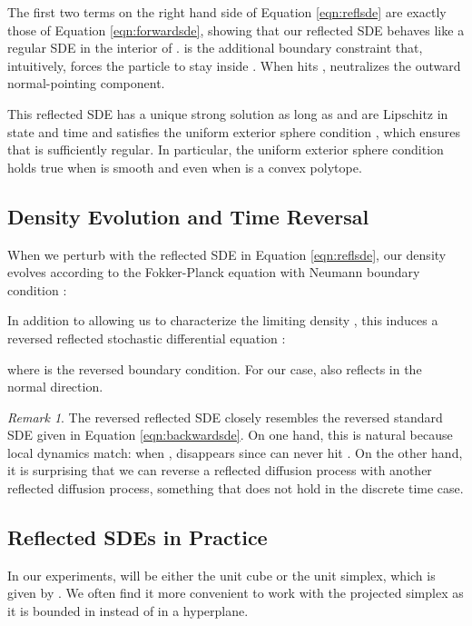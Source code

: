 \documentclass{article}
\theoremstyle{plain}
\theoremstyle{definition}
\theoremstyle{remark}
\newtheorem{remark}[theorem]{Remark}
\begin{document}
The first two terms on the right hand side of Equation \ref{eqn:reflsde} are exactly those of Equation \ref{eqn:forwardsde}, showing that our reflected SDE behaves like a regular SDE in the interior of .  is the additional boundary constraint that, intuitively, forces the particle to stay inside . When  hits ,  neutralizes the outward normal-pointing component.

This reflected SDE has a unique strong solution as long as  and  are Lipschitz in state and time and  satisfies the uniform exterior sphere condition \citep[Theorem 2.5.4]{Pilipenko2014AnIT}, which ensures that  is sufficiently regular. In particular, the uniform exterior sphere condition holds true when  is smooth and even when  is a convex polytope.

\subsection{Density Evolution and Time Reversal}\label{sec:method:reverse}

When we perturb  with the reflected SDE in Equation \ref{eqn:reflsde}, our density evolves according to the Fokker-Planck equation with Neumann boundary condition \citep{Schuss2013BrownianDA}:
\vspace{-1.5mm}

In addition to allowing us to characterize the limiting density , this induces a reversed reflected stochastic differential equation \citep{Cattiaux1988TimeRO, Williams1988OnTO}:

where  is the reversed boundary condition. For our case,  also reflects in the normal direction.
\begin{remark}
    The reversed reflected SDE closely resembles the reversed standard SDE given in Equation \ref{eqn:backwardsde}. On one hand, this is natural because local dynamics match: when ,  disappears since  can never hit . On the other hand, it is surprising that we can reverse a reflected diffusion process with another reflected diffusion process, something that does not hold in the discrete time case.
\end{remark}

\subsection{Reflected SDEs in Practice}\label{sec:method:examples}

In our experiments,  will be either the unit cube  or the unit simplex, which is given by . We often find it more convenient to work with the projected simplex  as it is bounded in  instead of in a hyperplane.
\end{document}
